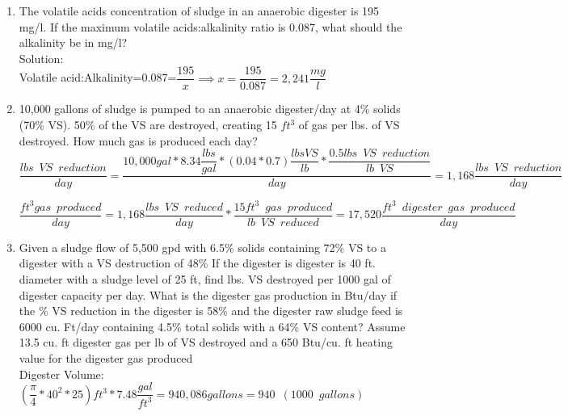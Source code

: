 \documentclass{article}
\begin{document}
\begin{enumerate}
\item The volatile acids concentration of sludge in an anaerobic digester is 195 mg/l. If the maximum volatile acids:alkalinity ratio is 0.087, what should the alkalinity be in mg/l?\\
Solution:\\
Volatile acid:Alkalinity=0.087=$\dfrac{195}{x}\implies x = \dfrac{195}{0.087} =\boxed{2,241\dfrac{mg}{l}}$
\pagebreak
	
\item 10,000 gallons of sludge is pumped to an anaerobic digester/day at 4\% solids (70\% VS).  50\% of the VS are destroyed, creating 15 $ft^3$ of gas per lbs. of VS destroyed. How much gas is produced each day?\\

{
$
	\dfrac
	{
	lbs \enspace VS \enspace reduction
	}
	{
	day
	}
	=
	\dfrac
	{
	10,000 gal * 8.34 \dfrac{lbs}{gal}*(0.04*0.7) \dfrac{lbs VS}{lb}*\dfrac{0.5 lbs \enspace VS \enspace  reduction}{lb \enspace VS}
	}
	{
	day
	}
 	=1,168
	\dfrac
	{
	lbs \enspace VS \enspace reduction
	}
	{
	day 
	}
$
}\\
\vspace{3mm}

{
$
	\dfrac 
	{
	ft^3 gas \enspace produced
	}
	{
	day
	}
	=
	1,168 \dfrac
			{
			lbs \enspace VS \enspace reduced
			}
			{
			day
			}
			*
		\dfrac
		{
		15 ft^3 \enspace gas \enspace produced
		}
		{
		lb \enspace VS \enspace reduced
		}
		=17,520 \dfrac
				{
				ft^3 \enspace digester \enspace 					gas \enspace produced
				}
				{
				day
				}
$
} 


\item Given a sludge flow of 5,500 gpd with 6.5\% solids containing  72\% VS to a digester with a VS destruction of 48\%   If the digester is digester is 40 ft. diameter with a sludge level of 25 ft, find lbs. VS destroyed per 1000 gal of digester capacity per day.  What is the digester gas production in Btu/day if the \% VS reduction in the digester is 58\% and the digester raw sludge feed is 6000 cu. Ft/day containing 4.5\% total solids with a 64\% VS content?  Assume 13.5 cu. ft digester gas per lb of VS destroyed and a 650 Btu/cu. ft heating value for the digester gas produced\\

{
Digester Volume: 
$
{
		(\dfrac
			{\pi}
			{4}*40^2*25)ft^3 *7.48 \dfrac{gal}{ft^3}
	}=940,086 gallons=940 \enspace(1000 \enspace gallons)
$
}\\
\vspace{3mm}


\end{enumerate}
\end{document}
